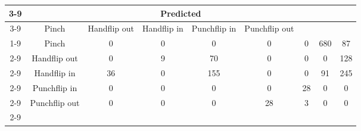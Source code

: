 \documentclass{standalone}
\begin{document}
 
 \begin{tabular}{|c |c |c |c |c |c |c |c |c |}
\cline{3-9}\multicolumn{2}{c|}{} & \multicolumn{7}{c|}{Predicted} \\ 
\cline{3-9} \multicolumn{2}{c |}{ } & Pinch & Handflip out & Handflip in & Punchflip in & Punchflip out\\ 
\cline{1-9}\multirow{7}{*}{\rotatebox[origin=c]{90}{Actual}} & Pinch & 0 & 0 & 0 & 0 & 0 & 680 & 87\\ 
 \cline{2-9} & Handflip out & 0 & 9 & 70 & 0 & 0 & 0 & 128\\ 
 \cline{2-9} & Handflip in & 36 & 0 & 155 & 0 & 0 & 91 & 245\\ 
 \cline{2-9} & Punchflip in & 0 & 0 & 0 & 0 & 28 & 0 & 0\\ 
 \cline{2-9} & Punchflip out & 0 & 0 & 0 & 28 & 3 & 0 & 0\\ 
 \cline{2-9}\hline \end{tabular}
 
\end{document}

